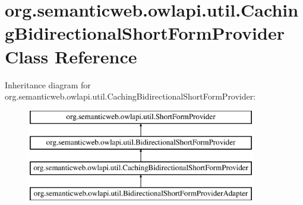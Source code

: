 \hypertarget{classorg_1_1semanticweb_1_1owlapi_1_1util_1_1_caching_bidirectional_short_form_provider}{\section{org.\-semanticweb.\-owlapi.\-util.\-Caching\-Bidirectional\-Short\-Form\-Provider Class Reference}
\label{classorg_1_1semanticweb_1_1owlapi_1_1util_1_1_caching_bidirectional_short_form_provider}
}
Inheritance diagram for org.\-semanticweb.\-owlapi.\-util.\-Caching\-Bidirectional\-Short\-Form\-Provider\-:\begin{figure}[H]
\begin{center}
\leavevmode
\includegraphics[height=4.000000cm]{classorg_1_1semanticweb_1_1owlapi_1_1util_1_1_caching_bidirectional_short_form_provider}
\end{center}
\end{figure}
